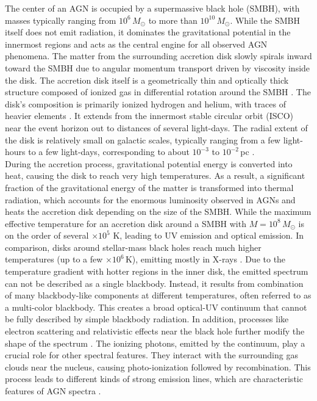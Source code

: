 The center of an AGN is occupied by a supermassive black hole (SMBH), with masses typically ranging from $10^6\,M_\odot$ to more than $10^{10}\,M_\odot$. While the SMBH itself does not emit radiation, it dominates the gravitational potential in the innermost regions and acts as the central engine for all observed AGN phenomena. The matter from the surrounding accretion disk slowly spirals inward toward the SMBH due to angular momentum transport driven by viscosity inside the disk. The accretion disk itself is a geometrically thin and optically thick structure composed of ionized gas in differential rotation around the SMBH \parencite{shakura1973black}. The disk's composition is primarily ionized hydrogen and helium, with traces of heavier elements \parencite{netzer2013agn}. It extends from the innermost stable circular orbit (ISCO) near the event horizon out to distances of several light-days. The radial extent of the disk is relatively small on galactic scales, typically ranging from a few light-hours to a few light-days, corresponding to about $10^{-3}$ to $10^{-2}$\,pc \parencite{netzer2013agn,hickox2018obscured}.  \\
During the accretion process, gravitational potential energy is converted into heat, causing the disk to reach very high temperatures. As a result, a significant fraction of the gravitational energy of the matter is transformed into thermal radiation, which accounts for the enormous luminosity observed in AGNs and heats the accretion disk depending on the size of the SMBH. While the maximum effective temperature for an accretion disk around a SMBH with $M = 10^8\,M_\odot$ is on the order of several $\times 10^5$ K, leading to UV emission and optical emission. In comparison, disks around stellar-mass black holes reach much higher temperatures (up to a few $\times 10^6$\,K), emitting mostly in X-rays \parencite{netzer2013agn}. Due to the temperature gradient with hotter regions in the inner disk, the emitted spectrum can not be described as a single blackbody. Instead, it results from combination of many blackbody-like components at different temperatures, often referred to as a multi-color blackbody. This creates a broad optical-UV continuum that cannot be fully described by simple blackbody radiation. In addition, processes like electron scattering and relativistic effects near the black hole further modify the shape of the spectrum \parencite{netzer2013agn}.
The ionizing photons, emitted by the continuum, play a crucial role for other spectral features. They interact with the surrounding gas clouds near the nucleus, causing photo-ionization followed by recombination. This process leads to different kinds of strong emission lines, which are characteristic features of AGN spectra \parencite{osterbrock1989agn}.



